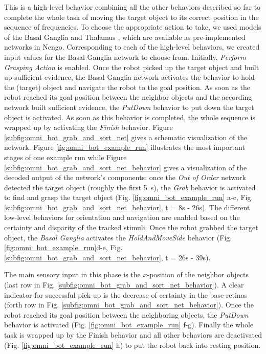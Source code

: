 This is a high-level behavior combining all the other behaviors described so far to complete the whole task of moving the target object to its correct position in the sequence of frequencies. 
To choose the appropriate action to take, we used models of the Basal Ganglia and Thalamus \cite{Stewart2010}, which are available as pre-implemented networks in \ac{Nengo}.
Corresponding to each of the high-level behaviors, we created input values for the Basal Ganglia network to choose from. 
Initially, \emph{Perform Grasping Action} is enabled. 
Once the robot picked up the target object and built up sufficient evidence, the Basal Ganglia network activates the behavior to hold the (target) object and navigate the robot to the goal position. 
As soon as the robot reached its goal position between the neighbor objects and the according network built sufficient evidence, the \emph{PutDown} behavior to put down the target object is activated. 
As soon as this behavior is completed, the whole sequence is wrapped up by activating the \emph{Finish} behavior. 
Figure \ref{subfig:omni_bot_grab_and_sort_net} gives a schematic visualization of the network. 
Figure \ref{fig:omni_bot_example_run} illustrates the most important stages of one example run while Figure \ref{subfig:omni_bot_grab_and_sort_net_behavior} gives a visualization of the decoded output of the network’s components: once the \emph{Out of Order} network detected the target object (roughly the first \SI{5}{\second}), the \emph{Grab} behavior is activated to find and grasp the target object (Fig. \ref{fig:omni_bot_example_run} a-c, Fig. \ref{subfig:omni_bot_grab_and_sort_net_behavior}, t = 8s - 26s). 
The different low-level behaviors for orientation and navigation are enabled based on the certainty and disparity of the tracked stimuli. 
Once the robot grabbed the target object, the \emph{Basal Ganglia} activates the \emph{HoldAndMoveSide} behavior (Fig. \ref{fig:omni_bot_example_run}d-e, Fig. \ref{subfig:omni_bot_grab_and_sort_net_behavior}, t = 26s - 39s). 

The main sensory input in this phase is the $x$-position of the neighbor objects (last row in Fig. \ref{subfig:omni_bot_grab_and_sort_net_behavior}). 
A clear indicator for successful pick-up is the decrease of certainty in the base-retinas (forth row in Fig. \ref{subfig:omni_bot_grab_and_sort_net_behavior}). 
Once the robot reached its goal position between the neighboring objects, the \emph{PutDown} behavior is activated (Fig. \ref{fig:omni_bot_example_run} f-g). 
Finally the whole task is wrapped up by the Finish behavior and all other behaviors are deactivated (Fig. \ref{fig:omni_bot_example_run} h) to put the robot back into resting position.

